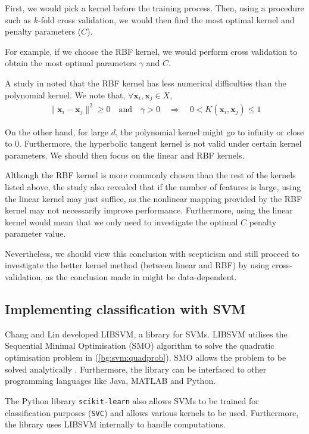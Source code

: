 \documentclass[12pt, twoside, a4paper]{report}
\def\vec{\boldsymbol}
\begin{document}
First, we would pick a kernel before the training process. Then, using a procedure such as $k$-fold cross validation, we would then find the most optimal kernel and penalty parameters ($C$).

For example, if we choose the RBF kernel, we would  perform cross validation to obtain the most optimal parameters $\gamma$ and $C$.

A study in \cite{RefWorks:128} noted that the RBF kernel has less numerical difficulties than the polynomial kernel. We note that, $\forall \vec{x}_i, \vec{x}_j \in X$,
\begin{align*}
\| \vec{x}_i - \vec{x}_j \|^2 \geq 0 \quad \text{and} \quad \gamma > 0 \quad \Rightarrow \quad 0 < K(\vec{x}_i, \vec{x}_j) \leq 1 
\end{align*}

On the other hand, for large $d$, the polynomial kernel might go to infinity or close to 0. Furthermore, the hyperbolic tangent kernel is not valid under certain kernel parameters. We should then focus on the linear and RBF kernels.

Although the RBF kernel is more commonly chosen than the rest of the kernels listed above, the study also revealed that if the number of features is large, using the linear kernel may just suffice, as the nonlinear mapping provided by the RBF kernel may not necessarily improve performance. Furthermore, using the linear kernel would mean that we only need to investigate the optimal $C$ penalty parameter value.

Nevertheless, we should view this conclusion with scepticism and still proceed to investigate the better kernel method (between linear and RBF) by using cross-validation, as the conclusion made in \cite{RefWorks:128} might be data-dependent.

\subsection{Implementing classification with SVM}
Chang and Lin \cite{libsvm} developed LIBSVM, a library for SVMs. LIBSVM utilises the Sequential Minimal Optimisation (SMO) algorithm to solve the quadratic optimisation problem in (\ref{bg:svm:quadprob}). SMO allows the problem to be solved analytically \cite{RefWorks:126}. Furthermore, the library can be interfaced to other programming languages like Java, MATLAB and Python.

The Python library \texttt{scikit-learn} also allows SVMs to be trained for classification purposes (\texttt{SVC}) and allows various kernels to be used. Furthermore, the library uses LIBSVM internally to handle computations.
\end{document}

